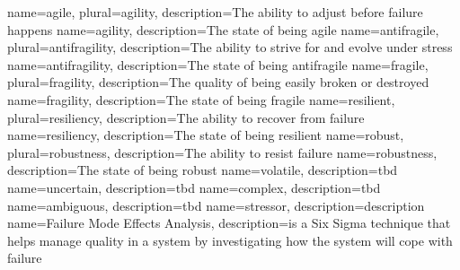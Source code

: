 
{
	name=agile,
	plural={agility},
	description={The ability to adjust before failure happens}
}
{
	name={agility},
	description={The state of being agile}
}
{
	name=antifragile,
	plural={antifragility},
	description={The ability to strive for and evolve under stress}
}
{
	name={antifragility},
	description={The state of being antifragile}
}
{
	name=fragile,
	plural={fragility},
	description={The quality of being easily broken or destroyed}
}
{
	name={fragility},
	description={The state of being fragile}
}
{
	name=resilient,
	plural={resiliency},
	description={The ability to recover from failure}
}
{
	name={resiliency},
	description={The state of being resilient}
}
{
	name=robust,
	plural={robustness},
	description={The ability to resist failure}
}
{
	name={robustness},
	description={The state of being robust}
}
{
	name=volatile,
	description={tbd}
}
{
	name=uncertain,
	description={tbd}
}
{
	name=complex,
	description={tbd}
}
{
	name=ambiguous,
	description={tbd}
}
{
	name={stressor},
	description={description}
}
{
	name={Failure Mode Effects Analysis},
	description={is a Six Sigma technique that helps manage quality in a system by investigating how the system will cope with failure}
}